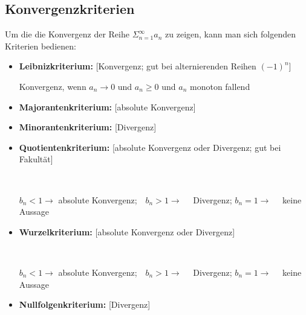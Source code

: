 \documentclass[a4paper,12pt]{article} %
\begin{document}
\subsection{Konvergenzkriterien}
Um die die Konvergenz der Reihe $\Sigma_{n=1}^{\infty}a_n$ zu zeigen, kann man sich folgenden Kriterien bedienen:
\begin{itemize}
\item \textbf{Leibnizkriterium:} [Konvergenz; gut bei alternierenden Reihen $(-1)^n$]
\begin{center}
\end{center}
Konvergenz, wenn $a_n \rightarrow 0$ und $a_n \geq 0$ und $a_n$ monoton fallend
\item \textbf{Majorantenkriterium:} [absolute Konvergenz]
\begin{center}
\end{center}
\item \textbf{Minorantenkriterium:} [Divergenz]
\begin{center}
\end{center}
\item \textbf{Quotientenkriterium:} [absolute Konvergenz oder Divergenz; gut bei Fakultät]
\begin{center}
\\
\end{center}
$b_n < 1 \rightarrow$ absolute Konvergenz;\ \ $b_n > 1 \rightarrow$ \ \ Divergenz; $b_n = 1 \rightarrow$ \ \ keine Aussage
\item \textbf{Wurzelkriterium:} [absolute Konvergenz oder Divergenz]
\begin{center}
\\
\end{center}
$b_n < 1 \rightarrow$ absolute Konvergenz;\ \ $b_n > 1 \rightarrow$ \ \ Divergenz; $b_n = 1 \rightarrow$ \ \ keine Aussage
\item \textbf{Nullfolgenkriterium:} [Divergenz]
\begin{center}
\end{center}
\end{itemize}
\end{document}
